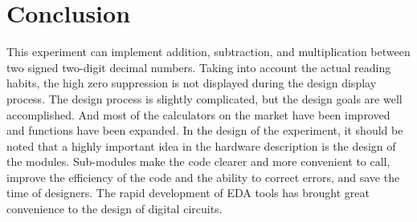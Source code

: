 \documentclass[conference,compsoc]{IEEEtran}
\begin{document}
\section{Conclusion}
This experiment can implement addition, subtraction, and multiplication between two signed two-digit decimal numbers. Taking into account the actual reading habits, the high zero suppression is not displayed during the design display process. The design process is slightly complicated, but the design goals are well accomplished. And most of the calculators on the market have been improved and functions have been expanded. In the design of the experiment, it should be noted that a highly important idea in the hardware description is the design of the modules. Sub-modules make the code clearer and more convenient to call, improve the efficiency of the code and the ability to correct errors, and save the time of designers. The rapid development of EDA tools has brought great convenience to the design of digital circuits.



%
%

\end{document}
